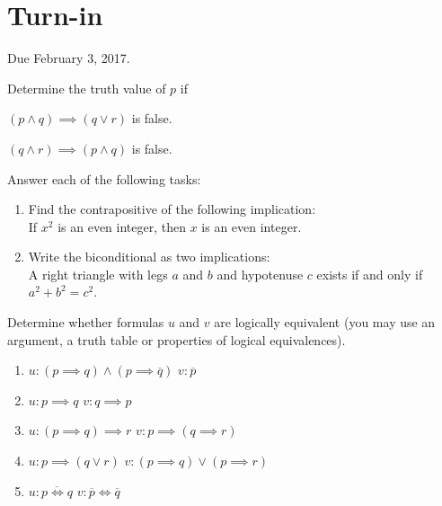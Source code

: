 \documentclass[12pt]{article}
\begin{document}
\section{Turn-in}

Due February 3, 2017.



\begin{qu} Determine the truth value of $p$ if

\begin{inparaenum}[a)]
\item $(p\land q) \implies (q \lor r)$ is false.
\tab \item $(q \land r) \implies (p \land q)$ is false.
\end{inparaenum}\end{qu}


\begin{qu} Answer each of the following tasks:
\begin{enumerate}[label=\alph*)]
\item Find the contrapositive of the following implication: \\
 If $x^2$ is an even integer, then $x$ is an even integer.
 \item Write the biconditional as two implications: \\
 A right triangle with legs $a$ and $b$ and hypotenuse $c$ exists if and only if $a^2+b^2=c^2$.
\end{enumerate}
\end{qu}

\begin{qu}
Determine whether formulas $u$ and $v$ are logically equivalent (you may use an argument, a truth table or properties of logical equivalences).
\begin{enumerate} [label=\alph*)]
\item $u: (p \implies q) \land (p \implies \overline{q})$ \tab $v: \overline{p}$
\item $u: p \implies q$ \tab $v: q \implies p$
\item $u: (p \implies q) \implies r$ \tab $v: p \implies (q \implies r)$
\item $u: p \implies (q \lor r) $ \tab $v: (p \implies q) \lor (p \implies r)$
\item $u: \overline{p \iff q}$ \tab $v: \overline{p} \iff \overline{q}$
\end{enumerate}
\end{qu}
\end{document}
